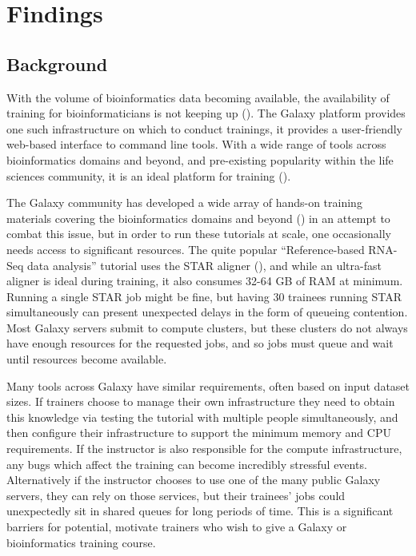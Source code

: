 \documentclass[a4paper,num-refs]{oup-contemporary}
\begin{document}
\section{Findings}
\subsection{Background}


With the volume of bioinformatics data becoming available, the availability of training for bioinformaticians is not keeping up (\cite{Attwood2017}).
The Galaxy platform \cite{afgan2018galaxy} provides one such infrastructure on which to conduct trainings, it provides a user-friendly web-based interface to command line tools. With a wide range of tools across bioinformatics domains and beyond, and pre-existing popularity within the life sciences community, it is an ideal platform for training (\cite{gtn}).

The Galaxy community has developed a wide array of hands-on training materials covering the bioinformatics domains and beyond (\cite{training-site}) in an attempt to combat this issue, but in order to run these tutorials at scale, one occasionally needs access to significant resources. The quite popular ``Reference-based RNA-Seq data analysis'' tutorial uses the STAR aligner (\cite{Dobin2012}), and while an ultra-fast aligner is ideal during training, it also consumes 32-64 GB of RAM at minimum. Running a single STAR job might be fine, but having 30 trainees running STAR simultaneously can present unexpected delays in the form of queueing contention. Most Galaxy servers submit to compute clusters, but these clusters do not always have enough resources for the requested jobs, and so jobs must queue and wait until resources become available.

Many tools across Galaxy have similar requirements, often based on input dataset sizes. If trainers choose to manage their own infrastructure they need to obtain this knowledge via testing the tutorial with multiple people simultaneously, and then configure their infrastructure to support the minimum memory and CPU requirements. If the instructor is also responsible for the compute infrastructure, any bugs which affect the training can become incredibly stressful events. Alternatively if the instructor chooses to use one of the many public Galaxy servers, they can rely on those services, but their trainees' jobs could unexpectedly sit in shared queues for long periods of time. This is a significant barriers for potential, motivate trainers who wish to give a Galaxy or bioinformatics training course.
\end{document}
